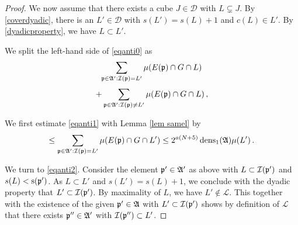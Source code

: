 {\begin{proof}
We now assume that there exists a cube $J \in \mathcal{D}$ with $L \subsetneq J$.
By \eqref{coverdyadic}, there is an
$L'\in \mathcal{D}$ with $s(L')=s(L)+1$ and $c(L)\in L'$. By \eqref{dyadicproperty}, we have
$L\subset L'$.

We split the left-hand side of \eqref{eqanti0} as
\begin{equation}\label{eqanti1}
    \sum_{\mathfrak p\in\mathfrak{A}':\mathcal{I}(\mathfrak p)=L'}\mu(E(\mathfrak p)\cap G\cap L)
\end{equation}
\begin{equation}\label{eqanti2}
    +
     \sum_{\mathfrak p\in\mathfrak{A}':\mathcal{I}(\mathfrak p)\neq L'}\mu(E(\mathfrak p)\cap G\cap L)\, ,
\end{equation}

We first estimate \eqref{eqanti1}
with Lemma \ref{lem samel} by
\begin{equation}\label{equanti1.5}
    \le \sum_{\mathfrak p\in\mathfrak{A}':\mathcal{I}(\mathfrak p)=L'}\mu(E(\mathfrak p)\cap G\cap L')\le 2^{a(N+5)}\operatorname{\operatorname{dens}}_1(\mathfrak{A})\mu(L')\, .
\end{equation}



We turn to \eqref{eqanti2}.
Consider the element $\mathfrak p'\in \mathfrak{A}'$ as above
with $L\subset \mathcal{I}(\mathfrak p')$ and $s(L)<\mathrm{s}(\mathfrak p')$.
As $L\subset L'$ and $s(L')=s(L)+1$, we conclude with the dyadic property that $L'\subset \mathcal{I}(\mathfrak p')$.
By maximality of $L$, we have
$L'\not\in \mathcal{L}$.
This together with the existence of the given $\mathfrak p'\in \mathfrak{A}$
with $L'\subset \mathcal{I}(\mathfrak p')$
shows by definition of $\mathcal{L}$ that there exists $\mathfrak p''\in \mathfrak{A}'$ with
$\mathcal{I}(\mathfrak p'')\subset L'$.





\end{proof}}
